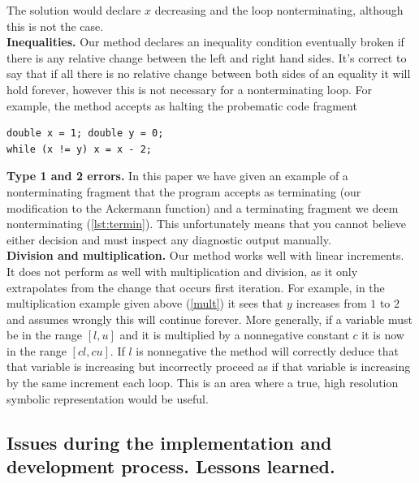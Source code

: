\documentclass[12pt,a4paper]{article}
\begin{document}
The solution would declare $x$ decreasing and the loop nonterminating, although this is not the case.\\

\textbf{Inequalities.} Our method declares an inequality condition eventually broken if there is any relative change between the left and right hand sides.
It's correct to say that if all there is no relative change between both sides of an equality it will hold forever, however this is not necessary for a nonterminating loop.
For example, the method accepts as halting the probematic code fragment
\begin{center}
\begin{minipage}{6.5cm}
\begin{lstlisting}[language=myLang, frame=tlrb, numbers=none, linewidth=6cm]
double x = 1; double y = 0;
while (x != y) x = x - 2;
\end{lstlisting}
\end{minipage}
\end{center}

\textbf{Type 1 and 2 errors.} In this paper we have given an example of a nonterminating fragment that the program accepts as terminating (our modification to the
Ackermann function) and a terminating fragment we deem nonterminating (\cref{lst:termin}). This unfortunately means that you cannot believe either decision and must
inspect any diagnostic output manually.\\

\textbf{Division and multiplication.} Our method works well with linear increments. It does not perform as well with multiplication and division, as it only extrapolates
from the change that occurs first iteration. For example, in the multiplication example given above (\cref{mult}) it sees that $y$ increases from $1$ to $2$
and assumes wrongly this will continue forever. More generally, if a variable must be in the range $[l, u]$ and it is multiplied by a nonnegative constant $c$ it is now in the range $[cl, cu]$. If $l$ is nonnegative the method will correctly deduce that that variable is increasing but incorrectly proceed as if that variable is increasing by the same increment each loop. This is an area where a true, high resolution symbolic representation would be useful.

\subsection{Issues during the implementation and development process. Lessons learned.}
\end{document}
